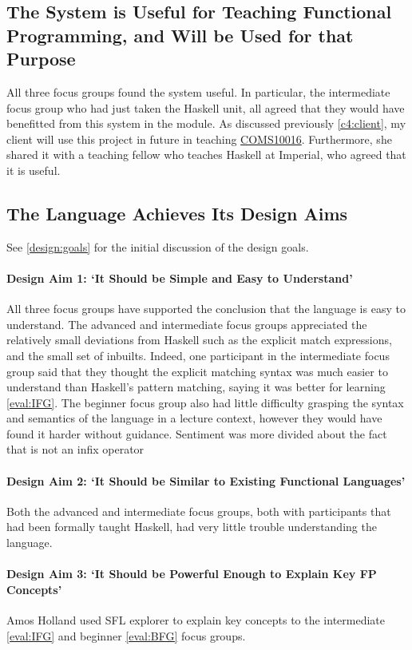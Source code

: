 \subsection{The System is Useful for Teaching Functional Programming, and Will be Used for that Purpose}
All three focus groups found the system useful. In particular, the intermediate focus group who had just taken the Haskell unit, all agreed that they would have benefitted from this system in the module. 
As discussed previously \ref{c4:client}, my client will use this project in future in teaching \hyperref[COMS10016]{COMS10016}. Furthermore, she shared it with a teaching fellow who teaches Haskell at Imperial, who agreed that it is useful. 

\subsection{The Language Achieves Its Design Aims}
See \ref{design:goals} for the initial discussion of the design goals. 

\paragraph{Design Aim 1: `It Should be Simple and Easy to Understand'}
All three focus groups have supported the conclusion that the language is easy to understand. The advanced and intermediate focus groups appreciated the relatively small deviations from Haskell such as the explicit match expressions, and the small set of inbuilts. Indeed, one participant in the intermediate focus group said that they thought the explicit matching syntax was much easier to understand than Haskell's pattern matching, saying it was better for learning \ref{eval:IFG}. The beginner focus group also had little difficulty grasping the syntax and semantics of the language in a lecture context, however they would have found it harder without guidance. Sentiment was more divided about the fact that  is not an infix operator


\paragraph{Design Aim 2: `It Should be Similar to Existing Functional Languages'}
Both the advanced and intermediate focus groups, both with participants that had been formally taught Haskell, had very little trouble understanding the language. 

\paragraph{Design Aim 3: `It Should be Powerful Enough to Explain Key \ac{FP} Concepts'}
Amos Holland used SFL explorer to explain key concepts to the intermediate \ref{eval:IFG} and beginner \ref{eval:BFG} focus groups. 

